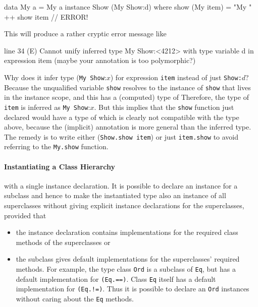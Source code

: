 \begin{code}
    data My a = My a
    instance Show (My Show:d) where
        show (My item) = "My " ++ show item       // ERROR!
\end{code}

This will produce a rather cryptic error message like
\begin{code}
line 34 (E) Cannot unify inferred type  My Show:<4212>
        with type variable d
        in expression  item
        (maybe your annotation is too polymorphic?)
\end{code}

Why does it infer type (\texttt{My Show}:$x$) for expression \texttt{item} instead of just \texttt{Show:}$d$? Because the unqualified variable \texttt{show} resolves to the instance of \texttt{show} that lives in the instance scope, and this has a (computed) type of 
Therefore, the type of \texttt{item} is inferred as \texttt{My Show}:$x$. But this implies that the \texttt{show} function just declared would have a type of 
which is clearly not compatible with the type above, because the (implicit) annotation is more general than the inferred type.
The remedy is to write either (\texttt{Show.show item}) or just \texttt{item.show} to avoid referring to the \texttt{My.show} function.

\paragraph{Instantiating a Class Hierarchy} with a single instance declaration. It is possible to declare an instance for a subclass and hence to make the instantiated type also an instance of all superclasses without giving explicit instance declarations for the superclasses, provided that
\begin{itemize}
\item the instance declaration contains implementations for the required class methods of the superclasses or
\item the subclass gives default implementations for the superclasses' required methods.
For example, the type class \texttt{Ord} is a subclass of \texttt{Eq}, but has a default implementation for \texttt{(Eq.==)}.
Class \texttt{Eq} itself has a default implementation for \texttt{(Eq.!=)}.
Thus it is possible to declare an \texttt{Ord} instances without caring about the \texttt{Eq} methods.
\end{itemize}


